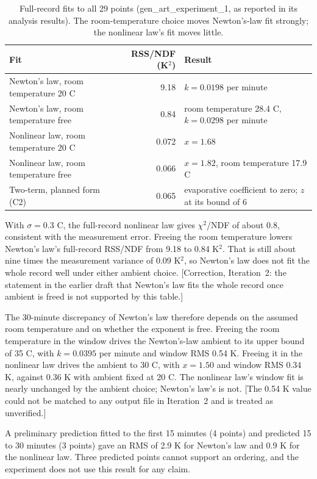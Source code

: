 \documentclass[11pt,letterpaper]{article}
\begin{document}
\begin{table}[!htbp]
\centering
\small
\caption{Full-record fits to all 29 points (gen\_art\_experiment\_1, as reported in its analysis results). The room-temperature choice moves Newton's-law fit strongly; the nonlinear law's fit moves little.}
\label{tab:it1-full}
\begin{tabularx}{\linewidth}{Xr X}
\toprule
Fit & RSS/NDF (K$^2$) & Result \\
\midrule
Newton's law, room temperature 20 C & 9.18 & $k = 0.0198$ per minute \\
Newton's law, room temperature free & 0.84 & room temperature 28.4 C, $k = 0.0298$ per minute \\
Nonlinear law, room temperature 20 C & 0.072 & $x = 1.68$ \\
Nonlinear law, room temperature free & 0.066 & $x = 1.82$, room temperature 17.9 C \\
Two-term, planned form (C2) & 0.065 & evaporative coefficient to zero; $z$ at its bound of 6 \\
\bottomrule
\end{tabularx}
\end{table}

With $\sigma = 0.3$ C, the full-record nonlinear law gives $\chi^2$/NDF of about 0.8, consistent with the measurement error. Freeing the room temperature lowers Newton's law's full-record RSS/NDF from 9.18 to 0.84 K$^2$. That is still about nine times the measurement variance of 0.09 K$^2$, so Newton's law does not fit the whole record well under either ambient choice. [Correction, Iteration~2: the statement in the earlier draft that Newton's law fits the whole record once ambient is freed is not supported by this table.]

The 30-minute discrepancy of Newton's law therefore depends on the assumed room temperature and on whether the exponent is free. Freeing the room temperature in the window drives the Newton's-law ambient to its upper bound of 35 C, with $k = 0.0395$ per minute and window RMS 0.54 K. Freeing it in the nonlinear law drives the ambient to 30 C, with $x = 1.50$ and window RMS 0.34 K, against 0.36 K with ambient fixed at 20 C. The nonlinear law's window fit is nearly unchanged by the ambient choice; Newton's law's is not. [The 0.54 K value could not be matched to any output file in Iteration~2 and is treated as unverified.]

A preliminary prediction fitted to the first 15 minutes (4 points) and predicted 15 to 30 minutes (3 points) gave an RMS of 2.9 K for Newton's law and 0.9 K for the nonlinear law. Three predicted points cannot support an ordering, and the experiment does not use this result for any claim.
\end{document}
